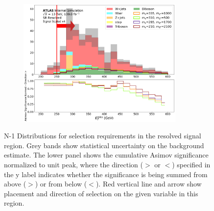 \begin{figure}[htbp]
\begin{subfigure}[t]{0.48\textwidth}
     \includegraphics[width = 0.9\textwidth]{Figures/5/SR1L_Resolved/MetTST_met_normSig_N_1.pdf}
    \caption{\met}
    \end{subfigure}
     \caption{N-1 Distributions for selection requirements in the resolved signal region. Grey bands show statistical uncertainty on the background estimate. The lower panel shows the cumulative Asimov significance normalized to unit peak, where the direction (\(>\) or \(<\)) specified in the y label indicates whether the significance is being summed from above (\(>\)) or from below (\(<\)). Red vertical line and arrow show placement and direction of selection on the given variable in this region.}
     \label{fig:Nminus1resolvedSR}
\end{figure}
